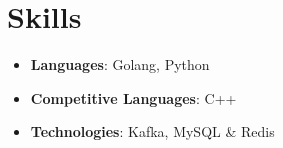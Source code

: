 \documentclass[letterpaper,11pt]{article}
\newcommand{\resumeItem}[2]{
  \item\small{
    \textbf{#1}{: #2 \vspace{-2pt}}
  }
}
\newcommand{\resumeSubItem}[2]{\resumeItem{#1}{#2}\vspace{-4pt}}
\newcommand{\resumeSubHeadingListStart}{\begin{itemize}[leftmargin=*]}
\newcommand{\resumeSubHeadingListEnd}{\end{itemize}}
\begin{document}

%
\section{Skills}
 \resumeSubHeadingListStart
    \resumeSubItem{Languages}{Golang, Python}
    \resumeSubItem{Competitive Languages}{C++}
    \resumeSubItem{Technologies}{Kafka, MySQL \& Redis}
 \resumeSubHeadingListEnd


\end{document}
